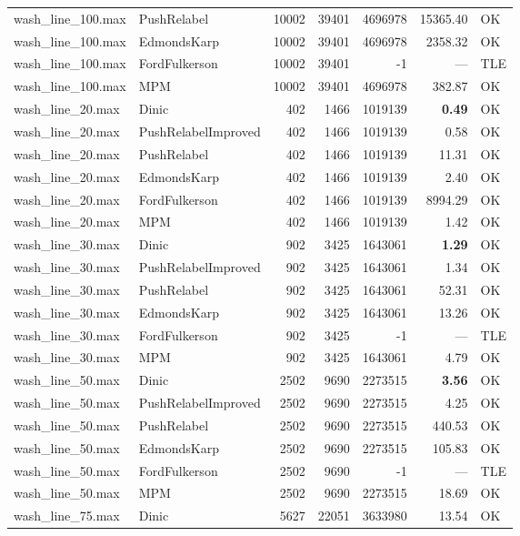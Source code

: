 \begin{longtable}{llrrrrl}
wash\_line\_100.max & PushRelabel & 10002 & 39401 & 4696978 & 15365.40 & OK \\
wash\_line\_100.max & EdmondsKarp & 10002 & 39401 & 4696978 & 2358.32 & OK \\
wash\_line\_100.max & FordFulkerson & 10002 & 39401 & -1 & --- & TLE \\
wash\_line\_100.max & MPM & 10002 & 39401 & 4696978 & 382.87 & OK \\
\midrule
wash\_line\_20.max & Dinic & 402 & 1466 & 1019139 & \textbf{0.49} & OK \\
wash\_line\_20.max & PushRelabelImproved & 402 & 1466 & 1019139 & 0.58 & OK \\
wash\_line\_20.max & PushRelabel & 402 & 1466 & 1019139 & 11.31 & OK \\
wash\_line\_20.max & EdmondsKarp & 402 & 1466 & 1019139 & 2.40 & OK \\
wash\_line\_20.max & FordFulkerson & 402 & 1466 & 1019139 & 8994.29 & OK \\
wash\_line\_20.max & MPM & 402 & 1466 & 1019139 & 1.42 & OK \\
\midrule
wash\_line\_30.max & Dinic & 902 & 3425 & 1643061 & \textbf{1.29} & OK \\
wash\_line\_30.max & PushRelabelImproved & 902 & 3425 & 1643061 & 1.34 & OK \\
wash\_line\_30.max & PushRelabel & 902 & 3425 & 1643061 & 52.31 & OK \\
wash\_line\_30.max & EdmondsKarp & 902 & 3425 & 1643061 & 13.26 & OK \\
wash\_line\_30.max & FordFulkerson & 902 & 3425 & -1 & --- & TLE \\
wash\_line\_30.max & MPM & 902 & 3425 & 1643061 & 4.79 & OK \\
\midrule
wash\_line\_50.max & Dinic & 2502 & 9690 & 2273515 & \textbf{3.56} & OK \\
wash\_line\_50.max & PushRelabelImproved & 2502 & 9690 & 2273515 & 4.25 & OK \\
wash\_line\_50.max & PushRelabel & 2502 & 9690 & 2273515 & 440.53 & OK \\
wash\_line\_50.max & EdmondsKarp & 2502 & 9690 & 2273515 & 105.83 & OK \\
wash\_line\_50.max & FordFulkerson & 2502 & 9690 & -1 & --- & TLE \\
wash\_line\_50.max & MPM & 2502 & 9690 & 2273515 & 18.69 & OK \\
\midrule
wash\_line\_75.max & Dinic & 5627 & 22051 & 3633980 & 13.54 & OK \\

\end{longtable}
